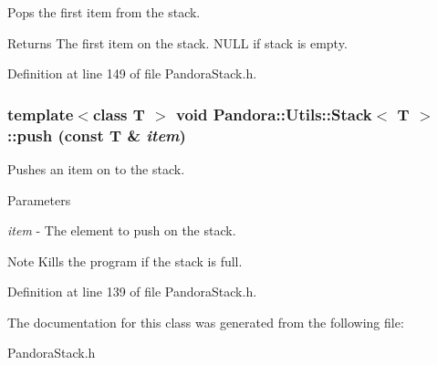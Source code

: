 Pops the first item from the stack. \begin{DoxyReturn}{Returns}
The first item on the stack. NULL if stack is empty. 
\end{DoxyReturn}


Definition at line 149 of file PandoraStack.h.\hypertarget{classPandora_1_1Utils_1_1Stack_a910af8de7eaaa2200515e7efb8251571}{
\subsubsection[{push}]{\setlength{\rightskip}{0pt plus 5cm}template$<$class T $>$ void {\bf Pandora::Utils::Stack}$<$ T $>$::push (const T \& {\em item})}}
\label{classPandora_1_1Utils_1_1Stack_a910af8de7eaaa2200515e7efb8251571}


Pushes an item on to the stack. 
\begin{DoxyParams}{Parameters}
\item[{\em item}]-\/ The element to push on the stack. \end{DoxyParams}
\begin{DoxyNote}{Note}
Kills the program if the stack is full. 
\end{DoxyNote}


Definition at line 139 of file PandoraStack.h.

The documentation for this class was generated from the following file:\begin{DoxyCompactItemize}
\item 
PandoraStack.h\end{DoxyCompactItemize}
